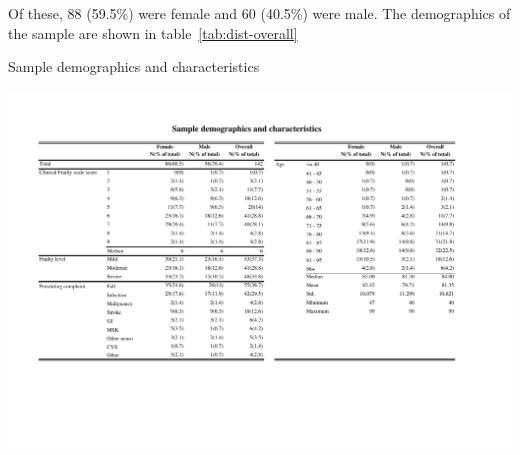 \documentclass
[
	12pt,
	a4paper,
	oneside,
]{report}
\begin{document}
Of these, 88 (59.5\%) were female and 60 (40.5\%) were male. The demographics of
the sample are shown in table~\ref{tab:dist-overall}

\begin{table}[p]
\caption{Sample demographics and characteristics}
\label{tab:dist-overall}
\includegraphics[width=\textwidth,
	trim={1.5cm 4cm 2.5cm 2cm},
	clip,
	angle=90,
	scale=1.45]{media/dist-overall}
\end{table}
\end{document}
